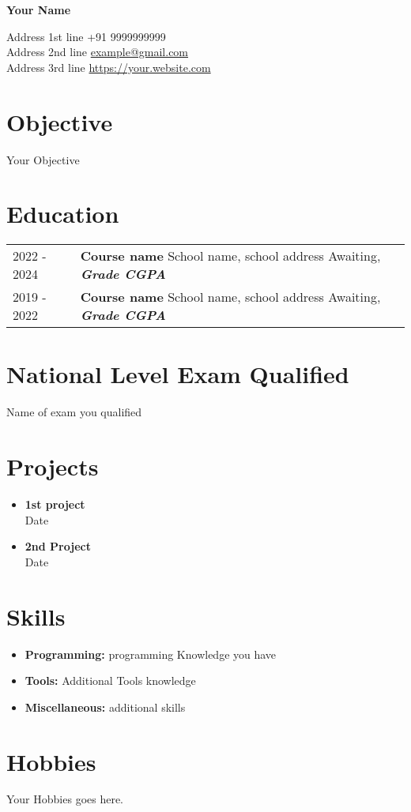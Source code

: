 \documentclass[12pt]{article}
\begin{document}
\begin{center}
     \Huge{\textbf{Your Name}}
\end{center}
Address 1st line \hfill +91 9999999999\\
Address 2nd line \hfill \href{mailto:example@gmail.com}{example@gmail.com} \\ 
Address 3rd line \hfill \url{https://your.website.com}

\section{Objective}
Your Objective


\section{Education}
\begin{tabular}{ l p{15in} }
    2022 - 2024 & \textbf{Course name} \newline School name, school address 
    \newline Awaiting, \textbf{\textit{Grade CGPA}} \\ 

    2019 - 2022 & \textbf{Course name} \newline School name, school address 
    \newline Awaiting, \textbf{\textit{Grade CGPA}} \\ 
\end{tabular}

\section{National Level Exam Qualified}
Name of exam you qualified

\section{Projects}
\begin{itemize}
    \itemsep=-0em
    \item \textbf{1st project} \\ 
Date
    \item \textbf{2nd Project} \\ 
Date
\end{itemize}

\section{Skills}
\begin{itemize}
    \itemsep=-.3em
    \item \textbf{Programming:} programming Knowledge you have
    \item \textbf{Tools:} Additional Tools knowledge
    \item \textbf{Miscellaneous:} additional skills
\end{itemize}

\section{Hobbies}
Your Hobbies goes here.
\end{document}
